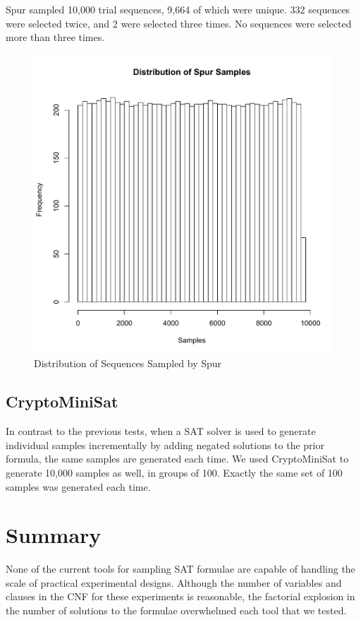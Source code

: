 Spur sampled 10,000 trial sequences, 9,664 of which were unique. 332 sequences were selected twice, and 2 were selected three times. No sequences were selected more than three times.

\begin{figure}[t]
\centering
\centerline{\includegraphics[origin=c,width=12cm]{../figures/spur-samples.pdf}}
\caption{Distribution of Sequences Sampled by Spur}
\label{fig:spur_samples}
\end{figure}


\subsection{CryptoMiniSat}

In contrast to the previous tests, when a SAT solver is used to generate individual samples incrementally by adding negated solutions to the prior formula, the same samples are generated each time. We used CryptoMiniSat to generate 10,000 samples as well, in groups of 100. Exactly the same set of 100 samples was generated each time.


\section{Summary}

None of the current tools for sampling SAT formulae are capable of handling the scale of practical experimental designs. Although the number of variables and clauses in the CNF for these experiments is reasonable, the factorial explosion in the number of solutions to the formulae overwhelmed each tool that we tested.





